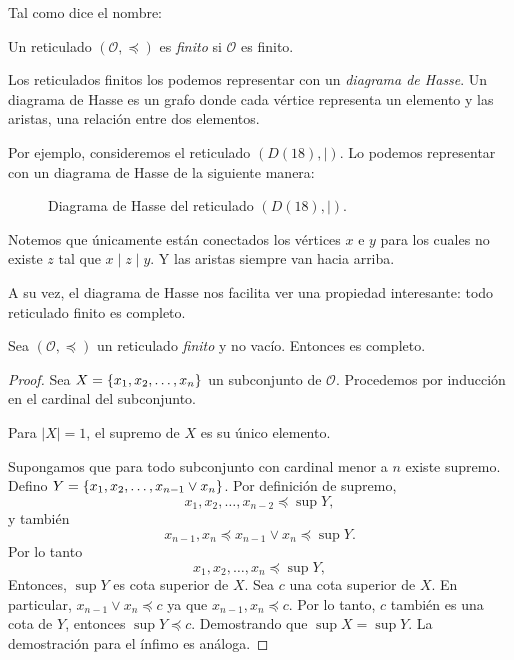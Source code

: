 Tal como dice el nombre:

\begin{definition}
    Un reticulado $(\mathcal{O}, \preceq)$ es \emph{finito} si $\mathcal{O}$ es finito.
\end{definition}

Los reticulados finitos los podemos representar con un \textit{diagrama de Hasse}. Un diagrama de Hasse es un grafo donde cada vértice representa un elemento y las aristas, una relación entre dos elementos.

Por ejemplo, consideremos el reticulado $(D(18), \mid)$. Lo podemos representar con un diagrama de Hasse de la siguiente manera:

\begin{figure}[H]
    \centering
    \caption{Diagrama de Hasse del reticulado $(D(18), \mid)$.}
\end{figure}

Notemos que únicamente están conectados los vértices $x$ e $y$ para los cuales no existe $z$ tal que $x \mid z \mid y$. Y las aristas siempre van hacia arriba.

A su vez, el diagrama de Hasse nos facilita ver una propiedad interesante: todo reticulado finito es completo.

\begin{proposition}
    Sea $(\mathcal{O}, \preceq)$ un reticulado \textit{finito} y no vacío. Entonces es completo.
\end{proposition}

\begin{proof}
    Sea $X = \left\{  x_{1}, x_{2}, \dots, x_{n}  \right\}$ un subconjunto de $\mathcal{O}$. Procedemos por inducción en el cardinal del subconjunto. 

    Para $\lvert X \rvert = 1$, el supremo de $X$ es su único elemento.

    Supongamos que para todo subconjunto con cardinal menor a $n$ existe supremo. Defino $Y = \left\{  x_{1}, x_{2}, \dots, x_{n-1} \vee x_{n}  \right\}$. Por definición de supremo,
    $$
        x_{1}, x_{2}, \dots, x_{n-2} \preceq \sup Y,
    $$
    y también
    $$
    x_{n-1}, x_{n} \preceq x_{n-1} \vee x_{n} \preceq \sup Y.
    $$
    Por lo tanto
    $$
        x_{1}, x_{2}, \dots, x_{n} \preceq \sup Y,
    $$
    Entonces, $\sup Y$ es cota superior de $X$. Sea $c$ una cota superior de $X$. En particular, $x_{n-1} \vee x_{n} \preceq c$ ya que $x_{n-1}, x_{n} \preceq c$. Por lo tanto, $c$ también es una cota de $Y$, entonces $\sup Y \preceq c$. Demostrando que $\sup X = \sup Y$. La demostración para el ínfimo es análoga.
\end{proof}

